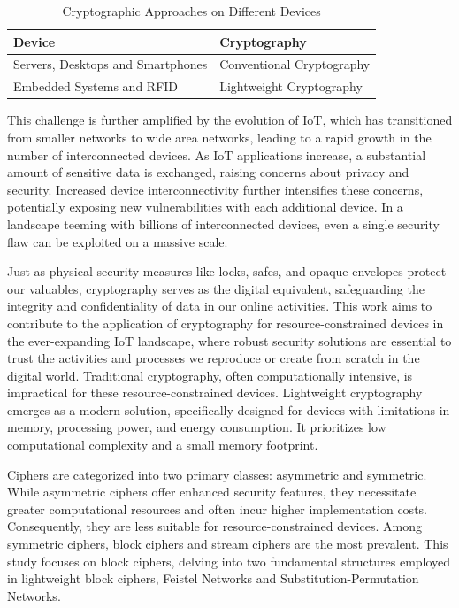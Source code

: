 \documentclass[conference]{IEEEtran}
\begin{document}
\begin{table}[ht]
    \centering
    \caption{Cryptographic Approaches on Different Devices}
    \begin{tabular}{ll}
        \toprule
        \textbf{Device} & \textbf{Cryptography} \\
        \midrule
        Servers, Desktops and Smartphones & Conventional Cryptography \\
        Embedded Systems and RFID & Lightweight Cryptography \\
        \bottomrule
    \end{tabular}
    \label{table:crypto_devices}
\end{table}

This challenge is further amplified by the evolution of IoT, which has transitioned from smaller networks to wide area networks, leading to a rapid growth in the number of interconnected devices. As IoT applications increase, a substantial amount of sensitive data is exchanged, raising concerns about privacy and security. Increased device interconnectivity further intensifies these concerns, potentially exposing new vulnerabilities with each additional device. In a landscape teeming with billions of interconnected devices, even a single security flaw can be exploited on a massive scale.

Just as physical security measures like locks, safes, and opaque envelopes protect our valuables, cryptography serves as the digital equivalent, safeguarding the integrity and confidentiality of data in our online activities. This work aims to contribute to the application of cryptography for resource-constrained devices in the ever-expanding IoT landscape, where robust security solutions are essential to trust the activities and processes we reproduce or create from scratch in the digital world. 
Traditional cryptography, often computationally intensive, is impractical for these resource-constrained devices.  Lightweight cryptography emerges as a modern solution, specifically designed for devices with limitations in memory, processing power, and energy consumption. It prioritizes low computational complexity and a small memory footprint.

Ciphers are categorized into two primary classes: asymmetric and symmetric. While asymmetric ciphers offer enhanced security features, they necessitate greater computational resources and often incur higher implementation costs. Consequently, they are less suitable for resource-constrained devices. Among symmetric ciphers, block ciphers and stream ciphers are the most prevalent. This study focuses on block ciphers, delving into two fundamental structures employed in lightweight block ciphers, Feistel Networks and Substitution-Permutation Networks.
\end{document}
